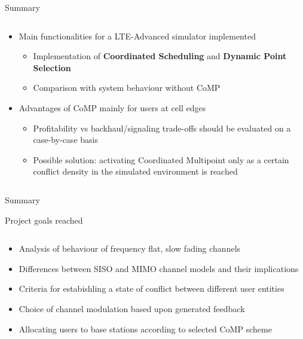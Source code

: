 \documentclass[xcolor={cmyk}]{beamer}
\begin{document}
\begin{frame}{Summary}
	\begin{block}{}
		\begin{columns}
			\begin{column}{.9\textwidth}
				\begin{itemize}
					\item Main functionalities for a LTE-Advanced simulator implemented
					\begin{itemize}
						\item Implementation of \textbf{Coordinated Scheduling} and \textbf{Dynamic Point Selection}
						\item Comparison with system behaviour without CoMP
					\end{itemize}
					\item Advantages of CoMP mainly for users at cell edges
					\begin{itemize}
						\item Profitability vs backhaul/signaling trade-offs should be evaluated on a case-by-case basis
						\item Possible solution: activating Coordinated Multipoint only as a certain conflict density in the simulated environment is reached
					\end{itemize}
				\end{itemize}
			\end{column}
		\end{columns}
	\end{block}
\end{frame}

\begin{frame}{Summary}
	 \begin{block}{Project goals reached}
	 	\begin{columns}
			\begin{column}{.9\textwidth}
				\begin{itemize}
					\item Analysis of behaviour of frequency flat, slow fading channels
					\item Differences between SISO and MIMO channel models and their implications
					\item Criteria for estabishling a state of conflict between different user entities
					\item Choice of channel modulation based upon generated feedback
					\item Allocating users to base stations according to selected CoMP scheme
				\end{itemize}
			\end{column}
		\end{columns}
	 \end{block}
 \end{frame}
\end{document}

